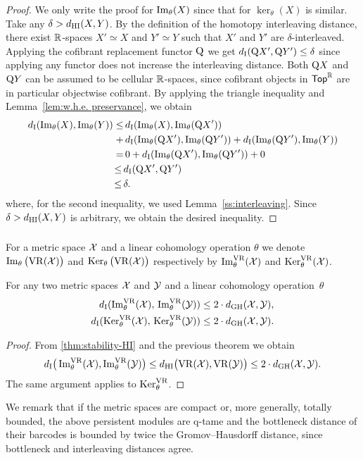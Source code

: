 \begin{proof}
	We only write the proof for $\operatorname{Im}_\theta(X)$ since that for $\ker_\theta(X)$ is similar.
	Take any $\delta > d_{\mathrm{HI}}(X,Y)$.
	By the definition of the homotopy interleaving distance, there exist $\mathbb{R}$-spaces $X' \simeq X$ and $Y' \simeq Y$ such that $X'$ and $Y'$ are $\delta$-interleaved.
	Applying the cofibrant replacement functor $\mathrm{Q}$ we get $d_{\mathrm{I}}(\mathrm{Q} X', \mathrm{Q} Y') \leq \delta$ since applying any functor does not increase the interleaving distance.
	Both $\mathrm{Q} X$ and $\mathrm{Q} Y$ can be assumed to be cellular $\mathbb{R}$-spaces, since cofibrant objects in $\mathsf{Top}^{\mathbb{R}}$ are in particular objectwise cofibrant.
	By applying the triangle inequality and Lemma~\ref{lem:w.h.e. preservance}, we obtain
	\begin{align*}
		d_{\mathrm{I}}(\operatorname{Im}_\theta(X), \operatorname{Im}_\theta(Y)) \leq& \,
		d_{\mathrm{I}}(\operatorname{Im}_\theta(X), \operatorname{Im}_\theta(\mathrm{Q} X')) \\ +& \,
		d_{\mathrm{I}}(\operatorname{Im}_\theta(\mathrm{Q} X'), \operatorname{Im}_\theta(\mathrm{Q} Y')) + d_{\mathrm{I}}(\operatorname{Im}_\theta(\mathrm{Q} Y'), \operatorname{Im}_\theta(Y)) \\ =& \,
		0 + d_{\mathrm{I}}(\operatorname{Im}_\theta(\mathrm{Q} X'), \operatorname{Im}_\theta(\mathrm{Q} Y')) + 0 \\ \leq \,&
		d_{\mathrm{I}}(\mathrm{Q} X', \mathrm{Q} Y') \\ \leq \,&
		\delta.
	\end{align*}
	where, for the second inequality, we used Lemma~\ref{ss:interleaving}.
	Since $\delta > d_{\mathrm{HI}}(X,Y)$ is arbitrary, we obtain the desired inequality.
\end{proof}

\subsubsection{}\label{thm:stability VR}

For a metric space \(\mathcal{X}\) and a linear cohomology operation \(\theta\) we denote \(\operatorname{Im}_\theta\big(\mathrm{VR}(\mathcal{X})\big)\) and \(\operatorname{Ker}_\theta\big(\mathrm{VR}(\mathcal{X})\big)\) respectively by \(\operatorname{Im}_\theta^{\mathrm{VR}}(\mathcal{X})\) and \(\operatorname{Ker}_\theta^{\mathrm{VR}}(\mathcal{X})\).

\theorem
For any two metric spaces $\mathcal{X}$ and $\mathcal{Y}$ and a linear cohomology operation~$\theta$
\begin{align*}
	d_{\mathrm{I}}(\operatorname{Im}_\theta^{\mathrm{VR}}(\mathcal{X}),\, \operatorname{Im}_\theta^{\mathrm{VR}}(\mathcal{Y})) \leq 2 \cdot d_{\mathrm{GH}}(\mathcal{X},\mathcal{Y}), \\
	d_{\mathrm{I}}(\operatorname{Ker}_\theta^{\mathrm{VR}}(\mathcal{X}),\, \operatorname{Ker}_\theta^{\mathrm{VR}}(\mathcal{Y})) \leq 2 \cdot d_{\mathrm{GH}}(\mathcal{X},\mathcal{Y}).
\end{align*}

\begin{proof}
	From \cref{thm:stability-HI} and the previous theorem we obtain
	\[
	d_{\mathrm{I}}\big(\operatorname{Im}_\theta^{\mathrm{VR}}(\mathcal{X}), \operatorname{Im}_\theta^{\mathrm{VR}}(\mathcal{Y})\big) \leq
	d_{\mathrm{HI}}\big(\mathrm{VR}(\mathcal{X}), \mathrm{VR}(\mathcal{Y})\big) \leq 2 \cdot d_{\mathrm{GH}}(\mathcal{X},\mathcal{Y}).
	\]
	The same argument applies to $\operatorname{Ker}_\theta^{\mathrm{VR}}$.
\end{proof}

We remark that if the metric spaces are compact or, more generally, totally bounded, the above persistent modules are q-tame and the bottleneck distance of their barcodes is bounded by twice the Gromov--Hausdorff distance, since bottleneck and interleaving distances agree.